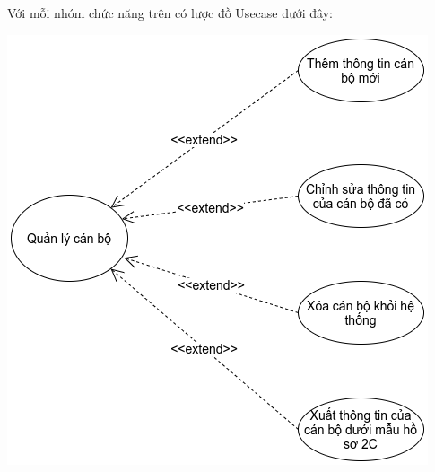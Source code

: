 Với mỗi nhóm chức năng trên có lược đồ Usecase dưới đây:
\begin{center}
  \captionsetup{type=figure}
  \includegraphics[scale=0.6]{img/UML/TchcStaff/quanlycanbo.png}
\end{center}

